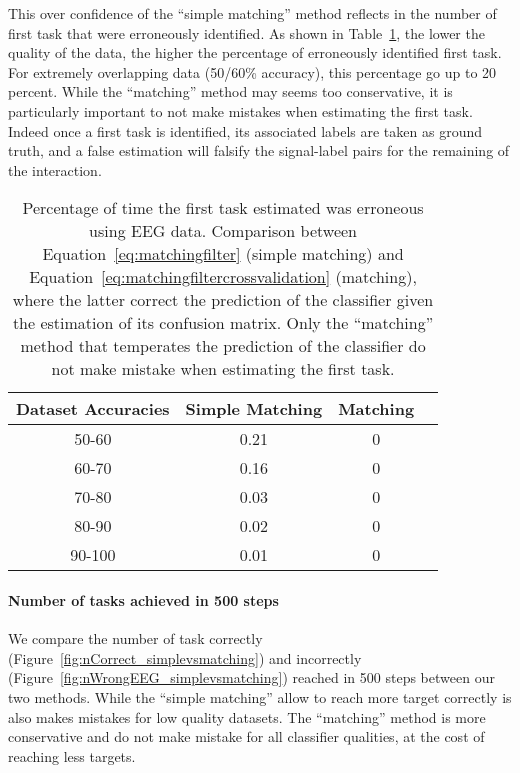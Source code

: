 This over confidence of the ``simple matching'' method reflects in the number of first task that were erroneously identified. As shown in Table~\ref{tab:errorTaskRatiosimplevsmatching}, the lower the quality of the data, the higher the percentage of erroneously identified first task. For extremely overlapping data (50/60\% accuracy), this percentage go up to 20 percent. While the ``matching'' method may seems too conservative, it is particularly important to not make mistakes when estimating the first task. Indeed once a first task is identified, its associated labels are taken as ground truth, and a false estimation will falsify the signal-label pairs for the remaining of the interaction.

\begin{table}[!ht]
\centering
{}
\begin{tabular}{c c c c}
    Dataset Accuracies & Simple Matching &  Matching \\ \hline
    50-60 & 0.21 & 0 \\ 
    60-70 & 0.16 & 0 \\
    70-80 & 0.03 & 0 \\
    80-90 & 0.02 & 0 \\
    90-100 & 0.01 & 0 \\
\end{tabular}
\caption{Percentage of time the first task estimated was erroneous using EEG data. Comparison between Equation~\ref{eq:matchingfilter} (simple matching) and Equation~\ref{eq:matchingfiltercrossvalidation} (matching), where the latter correct the prediction of the classifier given the estimation of its confusion matrix. Only the ``matching'' method that temperates the prediction of the classifier do not make mistake when estimating the first task.}
\label{tab:errorTaskRatiosimplevsmatching}
\end{table}

\paragraph{Number of tasks achieved in 500 steps}

We compare the number of task correctly (Figure~\ref{fig:nCorrect_simplevsmatching}) and incorrectly (Figure~\ref{fig:nWrongEEG_simplevsmatching}) reached in 500 steps between our two methods. While the ``simple matching'' allow to reach more target correctly is also makes mistakes for low quality datasets. The ``matching'' method is more conservative and do not make mistake for all classifier qualities, at the cost of reaching less targets.

